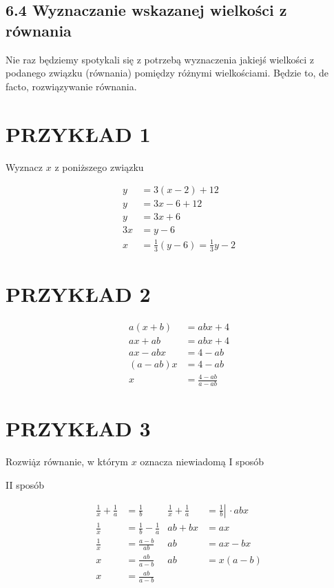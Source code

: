 \documentclass[10pt]{article}
\begin{document}
\subsection*{6.4 Wyznaczanie wskazanej wielkości z równania}
Nie raz będziemy spotykali się z potrzebą wyznaczenia jakiejś wielkości z podanego związku (równania) pomiędzy różnymi wielkościami. Będzie to, de facto, rozwiązywanie równania.

\section*{PRZYKŁAD 1}
Wyznacz \(x\) z poniższego związku

\[
\begin{aligned}
y & =3(x-2)+12 \\
y & =3 x-6+12 \\
y & =3 x+6 \\
3 x & =y-6 \\
x & =\frac{1}{3}(y-6)=\frac{1}{3} y-2
\end{aligned}
\]

\section*{PRZYKŁAD 2}
\[
\begin{aligned}
a(x+b) & =a b x+4 \\
a x+a b & =a b x+4 \\
a x-a b x & =4-a b \\
(a-a b) x & =4-a b \\
x & =\frac{4-a b}{a-a b}
\end{aligned}
\]

\section*{PRZYKŁAD 3}
Rozwią̇z równanie, w którym \(x\) oznacza niewiadomą I sposób

II sposób

\[
\begin{array}{rlrl}
\frac{1}{x}+\frac{1}{a} & =\frac{1}{b} & \frac{1}{x}+\frac{1}{a} & \left.=\frac{1}{b} \right\rvert\, \cdot a b x \\
\frac{1}{x} & =\frac{1}{b}-\frac{1}{a} & a b+b x & =a x \\
\frac{1}{x} & =\frac{a-b}{a b} & a b & =a x-b x \\
x & =\frac{a b}{a-b} & a b & =x(a-b) \\
x & =\frac{a b}{a-b}
\end{array}
\]
\end{document}
